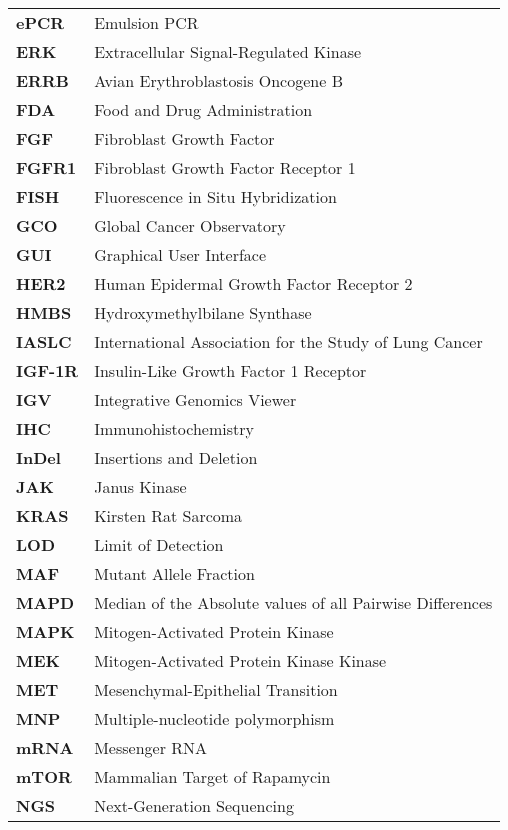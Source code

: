 \begin{longtable}[l]{l l}
    \textbf{ePCR} & Emulsion PCR \\
    \textbf{ERK} & Extracellular Signal-Regulated Kinase \\
    \textbf{ERRB} & Avian Erythroblastosis Oncogene B \\
    \textbf{FDA} & Food and Drug Administration \\
    \textbf{FGF} & Fibroblast Growth Factor \\
    \textbf{FGFR1} & Fibroblast Growth Factor Receptor 1 \\
    \textbf{FISH} & Fluorescence in Situ Hybridization \\
    \textbf{GCO} & Global Cancer Observatory \\
    \textbf{GUI} & Graphical User Interface \\
    \textbf{HER2} & Human Epidermal Growth Factor Receptor 2 \\
    \textbf{HMBS} & Hydroxymethylbilane Synthase \\
    \textbf{IASLC} & International Association for the Study of Lung Cancer \\
    \textbf{IGF-1R} & Insulin-Like Growth Factor 1 Receptor \\
    \textbf{IGV} & Integrative Genomics Viewer \\
    \textbf{IHC} & Immunohistochemistry \\
    \textbf{InDel} & Insertions and Deletion \\
    \textbf{JAK} & Janus Kinase \\
    \textbf{KRAS} & Kirsten Rat Sarcoma \\
    \textbf{LOD} & Limit of Detection \\
    \textbf{MAF} & Mutant Allele Fraction \\
    \textbf{MAPD} & Median of the Absolute values of all Pairwise Differences \\
    \textbf{MAPK} & Mitogen-Activated Protein Kinase \\
    \textbf{MEK} & Mitogen-Activated Protein Kinase Kinase \\
    \textbf{MET} & Mesenchymal-Epithelial Transition \\
    \textbf{MNP} & Multiple-nucleotide polymorphism \\
    \textbf{mRNA} & Messenger RNA \\
    \textbf{mTOR} & Mammalian Target of Rapamycin \\
    \textbf{NGS} & Next-Generation Sequencing \\

\end{longtable}
